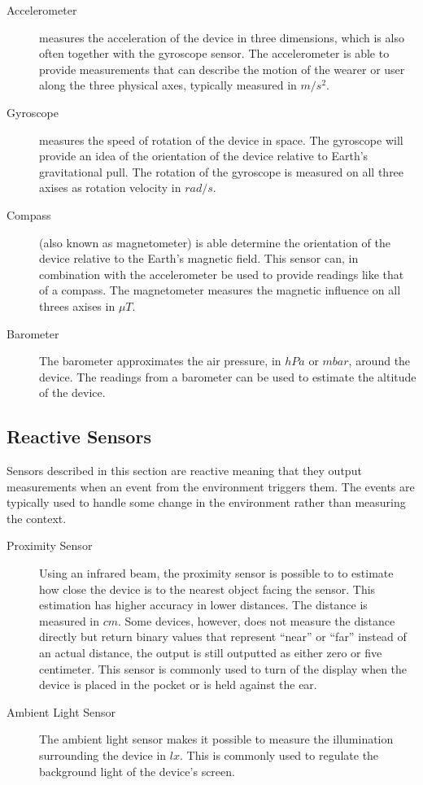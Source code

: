 \begin{description}
	\item[Accelerometer] measures the acceleration of the device in three dimensions, which is also often together with the gyroscope sensor. The accelerometer is able to provide measurements that can describe the motion of the wearer or user along the three physical axes, typically measured in $m/s^2$.
	\item[Gyroscope] measures the speed of rotation of the device in space. The gyroscope will provide an idea of the orientation of the device relative to Earth's gravitational pull. The rotation of the gyroscope is measured on all three axises as rotation velocity in $rad/s$.
	\item[Compass] (also known as magnetometer) is able determine the orientation of the device relative to the Earth's magnetic field. This sensor can, in combination with the accelerometer be used to provide readings like that of a compass. The magnetometer measures the magnetic influence on all threes axises in $\mu T$.
	\item[Barometer] The barometer approximates the air pressure, in $hPa$ or $mbar$, around the device. The readings from a barometer can be used to estimate the altitude of the device.
\end{description}

\subsection{Reactive Sensors}
Sensors described in this section are reactive meaning that they output measurements when an event from the environment triggers them. The events are typically used to handle some change in the environment rather than measuring the context.

\begin{description}
    \item[Proximity Sensor] Using an infrared beam, the proximity sensor is possible to to estimate how close the device is to the nearest object facing the sensor. This estimation has higher accuracy in lower distances. The distance is measured in $cm$. Some devices, however, does not measure the distance directly but return binary values that represent ``near'' or ``far'' instead of an actual distance, the output is still outputted as either zero or five centimeter. This sensor is commonly used to turn of the display when the device is placed in the pocket or is held against the ear.
    \item[Ambient Light Sensor] The ambient light sensor makes it possible to measure the illumination surrounding the device in $lx$. This is commonly used to regulate the background light of the device's screen.
\end{description}

